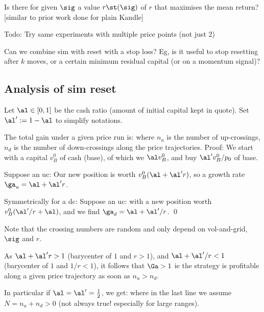 \documentclass[oneside,10pt]{article}
\begin{document}
\QS[1] Is there for given $\sig$ a value $r\st(\sig)$ of $r$ that maximises the mean return? [similar to prior work done
for plain Kandle]

Todo: Try same experiments with multiple price points (not just 2)

Can we combine sim with reset with a stop loss? Eg, is it useful to stop resetting after $k$ moves,
or a certain minimum residual capital (or on a momentum signal)?



\subsection{Analysis of sim reset}

Let $\al\in[0,1]$ be the cash ratio (amount of initial capital kept in quote).
Set $\al':=1-\al$ to simplify notations.

\PRO 
The total gain under a given price run is:
where $n_u$ is the number of up-crossings, $n_d$
is the number of down-crossings along the price trajectories.
\ORP
Proof:
We start with a capital $v^0_B$ of cash (base),
of which we $\al v^0_B$, and buy $\al'v^0_B/p_0$ of base. 

Suppose an uc:
Our new position is worth $v^0_B(\al+ \al'r)$,
so a growth rate $\ga_u=\al+ \al'r$.

Symmetrically for a dc:
Suppose an uc:
with a new position worth $v^0_B(\al'/r+\al )$, and we find $\ga_d=\al+ \al'/r$.
\qed

Note that the crossing numbers are random and only depend on vol-and-grid, $\sig$ and $r$.

As
$\al+\al' r>1$ (barycenter of $1$ and $r>1$), and  
$\al+\al'/r<1$ (barycenter of $1$ and $1/r<1$),
it follows that $\Ga>1$ ie the strategy is profitable along a given price trajectory as soon as $n_u>n_d$.

In particular if $\al=\al'=\frac12$, we get:
where in the last line we assume $N=n_u+n_d>0$ (not always true! especially for large ranges).
\end{document}
